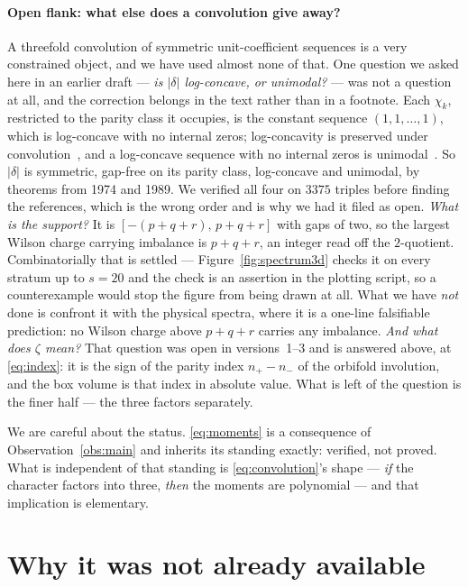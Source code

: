 \documentclass[11pt,a4paper]{article}
\begin{document}
\paragraph{Open flank: what else does a convolution give away?} A threefold convolution of
symmetric unit-coefficient sequences is a very constrained object, and we have used almost none
of that. One question we asked here in an earlier draft --- \emph{is $|\delta|$ log-concave,
or unimodal?} --- was not a question at all, and the correction belongs in the text rather than
in a footnote. Each $\chi_k$, restricted to the parity class it occupies, is the constant
sequence $(1,1,\dots,1)$, which is log-concave with no internal zeros; log-concavity is
preserved under convolution~\cite{Hoggar}, and a log-concave sequence with no internal zeros is
unimodal~\cite{Stanley}. So $|\delta|$ is symmetric, gap-free on its parity class, log-concave
and unimodal, by theorems from 1974 and 1989. We verified all four on $3375$ triples before
finding the references, which is the wrong order and is why we had it filed as open. \emph{What
is the support?} It is $[-(p{+}q{+}r),\,p{+}q{+}r]$
with gaps of two, so the largest Wilson charge carrying imbalance is $p+q+r$, an integer read
off the $2$-quotient. Combinatorially that is settled --- Figure~\ref{fig:spectrum3d} checks it
on every stratum up to $s=20$ and the check is an assertion in the plotting script, so a
counterexample would stop the figure from being drawn at all. What we have \emph{not} done is
confront it with the physical spectra, where it is a one-line falsifiable prediction: no Wilson
charge above $p+q+r$ carries any imbalance. \emph{And what does $\zeta$ mean?} That question was
open in versions~1--3 and is answered above, at \eqref{eq:index}: it is the sign of the parity
index $n_+-n_-$ of the orbifold involution, and the box volume is that index in absolute value.
What is left of the question is the finer half --- the three factors separately.

We are careful about the status. \eqref{eq:moments} is a consequence of
Observation~\ref{obs:main} and inherits its standing exactly: verified, not proved. What is
independent of that standing is \eqref{eq:convolution}'s shape --- \emph{if} the character
factors into three, \emph{then} the moments are polynomial --- and that implication is
elementary.

\section{Why it was not already available}\label{sec:why}
\end{document}

